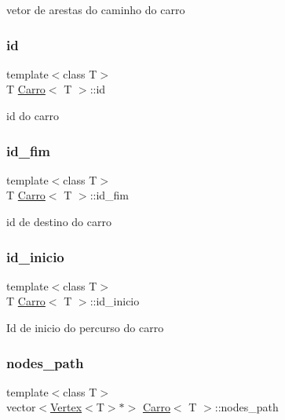 vetor de arestas do caminho do carro \mbox{\label{class_carro_ab7edb4871bda624992f83ef2b9d1babf}} 
\subsubsection{\texorpdfstring{id}{id}}
{\footnotesize\ttfamily template$<$class T$>$ \\
T \mbox{\hyperlink{class_carro}{Carro}}$<$ T $>$\+::id\hspace{0.3cm}{\ttfamily [private]}}

id do carro \mbox{\label{class_carro_a6d4a8cf39f76caecafa0bffcedc50efc}} 
\subsubsection{\texorpdfstring{id\+\_\+fim}{id\_fim}}
{\footnotesize\ttfamily template$<$class T$>$ \\
T \mbox{\hyperlink{class_carro}{Carro}}$<$ T $>$\+::id\+\_\+fim\hspace{0.3cm}{\ttfamily [private]}}

id de destino do carro \mbox{\label{class_carro_ac1142f0e001f982a7789fe20514f5db7}} 
\subsubsection{\texorpdfstring{id\+\_\+inicio}{id\_inicio}}
{\footnotesize\ttfamily template$<$class T$>$ \\
T \mbox{\hyperlink{class_carro}{Carro}}$<$ T $>$\+::id\+\_\+inicio\hspace{0.3cm}{\ttfamily [private]}}

Id de inicio do percurso do carro \mbox{\label{class_carro_a4cc76ed6acda558805f6039ec35ca53f}} 
\subsubsection{\texorpdfstring{nodes\+\_\+path}{nodes\_path}}
{\footnotesize\ttfamily template$<$class T$>$ \\
vector$<$\mbox{\hyperlink{class_vertex}{Vertex}}$<$T$>$$\ast$$>$ \mbox{\hyperlink{class_carro}{Carro}}$<$ T $>$\+::nodes\+\_\+path\hspace{0.3cm}{\ttfamily [private]}}

